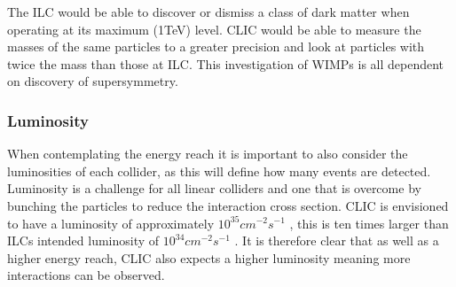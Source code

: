 The ILC would be able to discover or dismiss a class of dark matter when operating at its maximum (1TeV) level. CLIC would be able to measure the masses of the same particles to a greater precision and look at particles with twice the mass than those at ILC. This investigation of WIMPs is all dependent on discovery of supersymmetry.

\subsubsection{Luminosity}

When contemplating the energy reach it is important to also consider the luminosities of each collider, as this will define how many events are detected. Luminosity is a challenge for all linear colliders and one that is overcome by bunching the particles to reduce the interaction cross section. CLIC is envisioned to have a luminosity of approximately $10^{35} cm^{-2} s^{−1}$ \cite{CLIC:Luminosity}, this is ten times larger than ILCs intended luminosity of $10^{34} cm^{-2} s^{−1}$ \cite{IOP:ILC}. It is therefore clear that as well as a higher energy reach, CLIC also expects a higher luminosity meaning more interactions can be observed.



